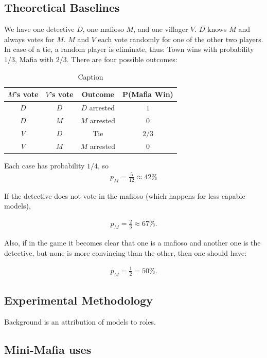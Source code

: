 \documentclass{article}
\begin{document}
\subsection{Theoretical Baselines}


We have one detective $D$, one mafioso $M$, and one villager $V$.  
$D$ knows $M$ and always votes for $M$.  
$M$ and $V$ each vote randomly for one of the other two players.  
In case of a tie, a random player is eliminate, thus: Town wins with probability $1/3$, Mafia with $2/3$. There are four possible outcomes:
\begin{table}[ht]
    \centering
    \begin{tabular}{|c|c|c|c|}
        \hline
        $M$'s vote & $V$'s vote & Outcome & P(Mafia Win) \\
        \hline
        $D$ & $D$ & $D$ arrested & $1$ \\
        $D$ & $M$ & $M$ arrested & $0$ \\
        $V$ & $D$ & Tie & $2/3$ \\
        $V$ & $M$ & $M$ arrested & $0$ \\
        \hline
    \end{tabular}
    \caption{Caption}
    \label{tab:placeholder}
\end{table}
Each case has probability $1/4$, so
\begin{align}
    p_M=\frac{5}{12}\approx42\%
\end{align}

If the detective does not vote in the mafioso (which happens for less capable models), 

\begin{align}
    p_M=\frac{2}{3}\approx 67\%.
\end{align}

Also, if in the game it becomes clear that one is a mafioso and another one is the detective, but none is more convincing than the other, then one should have:

\begin{align}
    p_M=\frac{1}{2}=50\%.
\end{align}


\subsection{Experimental Methodology}

Background is an attribution of models to roles. 


\subsection{Mini-Mafia uses}
\end{document}
